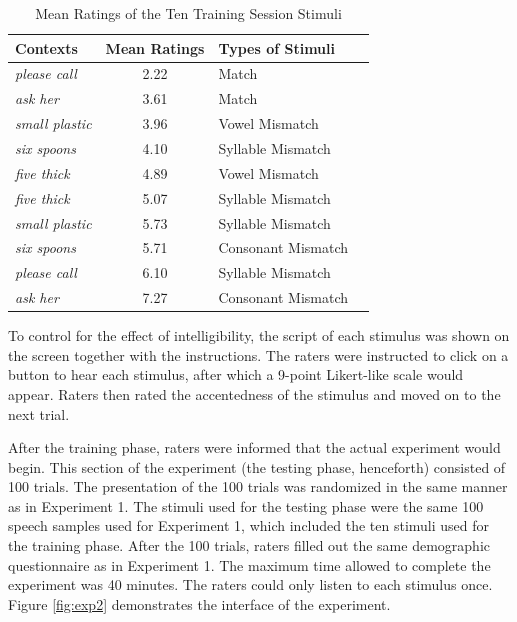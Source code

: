 \begin{table}[!h]
  \figSpace
  \centering
  \caption{Mean Ratings of the Ten Training Session Stimuli}
    \begin{tabular}{lcll}
    \toprule
     Contexts & Mean Ratings & Types of Stimuli \\
    \midrule
     \textit{please call} & 2.22  & Match \\
     \textit{ask her} & 3.61  & Match \\
   \textit{small plastic} & 3.96  & Vowel Mismatch \\
     \textit{six spoons} & 4.10   & Syllable Mismatch \\
     \textit{five thick} & 4.89  & Vowel Mismatch \\
     \textit{five thick} & 5.07  & Syllable Mismatch \\
    \textit{small plastic} & 5.73  & Syllable Mismatch \\
     \textit{six spoons} & 5.71  & Consonant Mismatch \\
     \textit{please call} & 6.10   & Syllable Mismatch \\
     \textit{ask her} & 7.27  & Consonant Mismatch \\
    \bottomrule
    \end{tabular}%
  \label{tab:train}%
    \figSpace
\end{table}%

To control for the effect of intelligibility, the script of each stimulus was shown on the screen together with the instructions. The raters were instructed to click on a button to hear each stimulus, after which a 9-point Likert-like scale would appear.  Raters then rated the accentedness of the stimulus and moved on to the next trial. 

After the training phase, raters were informed that the actual experiment would begin. This section of the experiment (the testing phase, henceforth) consisted of 100 trials. The presentation of the 100 trials was randomized in the same manner as in Experiment 1. The stimuli used for the testing phase were the same 100 speech samples used for Experiment 1, which included the ten stimuli used for the training phase. After the 100 trials, raters filled out the same demographic questionnaire as in Experiment 1. The maximum time allowed to complete the experiment was 40 minutes. The raters could only listen to each stimulus once. Figure \ref{fig:exp2} demonstrates the interface of the experiment.

